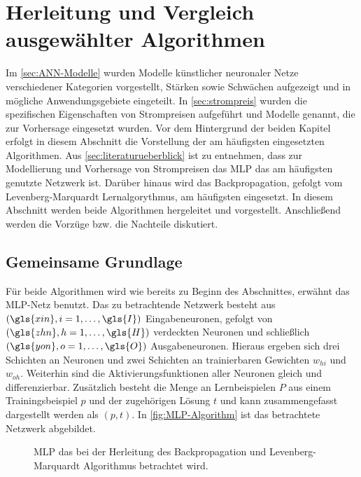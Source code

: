 


\section{Herleitung und Vergleich ausgewählter Algorithmen}\label{sec:algorithm}

Im \autoref{sec:ANN-Modelle} wurden Modelle künstlicher neuronaler Netze verschiedener Kategorien vorgestellt, Stärken sowie Schwächen aufgezeigt und in mögliche Anwendungsgebiete eingeteilt. In \autoref{sec:strompreis} wurden die spezifischen Eigenschaften von Strompreisen aufgeführt und Modelle genannt, die zur Vorhersage eingesetzt wurden. Vor dem Hintergrund der beiden Kapitel erfolgt in diesem Abschnitt die Vorstellung der am häufigsten eingesetzten Algorithmen. Aus \autoref{sec:literaturueberblick} ist zu entnehmen, dass zur Modellierung und Vorhersage von Strompreisen das MLP das am häufigsten genutzte Netzwerk ist. Darüber hinaus wird das Backpropagation, gefolgt vom Levenberg-Marquardt Lernalgorythmus, am häufigsten eingesetzt. In diesem Abschnitt werden beide Algorithmen hergeleitet und vorgestellt. Anschließend werden die Vorzüge bzw. die Nachteile diskutiert. 

\subsection{Gemeinsame Grundlage}
Für beide Algorithmen wird wie bereits zu Beginn des Abschnittes, erwähnt das MLP-Netz benutzt. Das zu betrachtende Netzwerk besteht aus $(\gls{xin}, i=1,\dots,\gls{I})$ Eingabeneuronen, gefolgt von $(\gls{zhn}, h=1,\dots,\gls{H})$ verdeckten Neuronen und schließlich $(\gls{yon}, o=1,\dots,\gls{O})$ Ausgabeneuronen. Hieraus ergeben sich drei Schichten an Neuronen und zwei Schichten an trainierbaren Gewichten $w_{hi}$ und $w_{oh}$. Weiterhin sind die Aktivierungsfunktionen aller Neuronen gleich und differenzierbar. Zusätzlich besteht die Menge an Lernbeispielen $P$ aus einem Trainingsbeispiel $p$ und der zugehörigen Lösung $t$ und kann zusammengefasst dargestellt werden als $(p,t)$. In \autoref{fig:MLP-Algorithm} ist das betrachtete Netzwerk abgebildet.


\begin{figure}[!htb]
    \centering
        
    \caption{MLP das bei der Herleitung des Backpropagation und Levenberg-Marquardt Algorithmus betrachtet wird.}
    \label{fig:MLP-Algorithm}
\end{figure}


